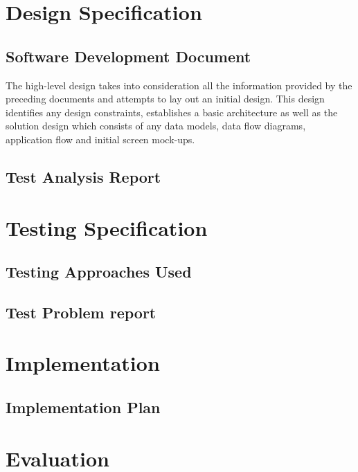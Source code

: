 \documentclass[a4paper,12pt]{article}
\begin{document}



\section {Design Specification}
\subsection {Software Development Document}

The high-level design takes into consideration all the information provided by the preceding documents
and attempts to lay out an initial design.  This design identifies any design constraints, establishes a basic architecture as well as
the solution design which consists of any data models, data flow diagrams, application flow and initial screen mock-ups.
\subsection {Test Analysis Report}

\section {Testing Specification}
\subsection {Testing Approaches Used}
\subsection {Test Problem report}

\section {Implementation}
\subsection {Implementation Plan}

\section {Evaluation}
\end{document}
